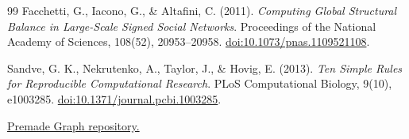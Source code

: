\documentclass[a4paper,12pt]{report}
\begin{document}
\begin{thebibliography}{99}
Facchetti, G., Iacono, G., \& Altafini, C. (2011). \textit{Computing Global Structural Balance in Large-Scale Signed Social Networks}. Proceedings of the National Academy of Sciences, 108(52), 20953--20958. \href{https://doi.org/10.1073/pnas.1109521108}{doi:10.1073/pnas.1109521108}.

Sandve, G. K., Nekrutenko, A., Taylor, J., \& Hovig, E. (2013). \textit{Ten Simple Rules for Reproducible Computational Research}. PLoS Computational Biology, 9(10), e1003285. \href{https://doi.org/10.1371/journal.pcbi.1003285}{doi:10.1371/journal.pcbi.1003285}.

\href{https://github.com/wpowertechgit/premadegraph}{Premade Graph repository.}

\end{thebibliography}
\end{document}
